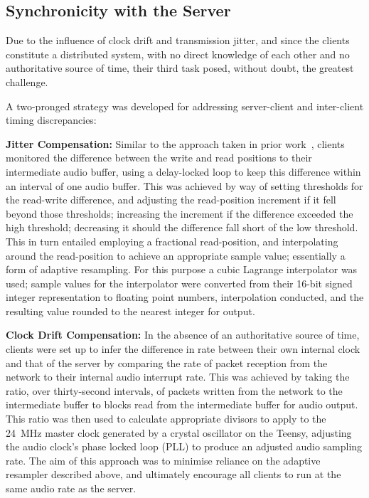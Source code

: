 \subsection{Synchronicity with the Server}\label{subsec:client-sync}

Due to the influence of clock drift and transmission jitter, and since the
clients constitute a distributed system, with no direct knowledge of each other
and no authoritative source of time, their third task posed, without doubt,
the greatest challenge.

A two-pronged strategy was developed for addressing server-client and
inter-client timing discrepancies:

\textbf{Jitter Compensation:}
Similar to the approach taken in prior
work~\citep{rushton_microcontroller-based_2023}, clients monitored the difference
between the write and read positions to their intermediate audio buffer,
using a delay-locked loop to keep this difference within an interval of one
audio buffer.
This was achieved by way of setting thresholds for the read-write difference,
and adjusting the read-position increment if it fell beyond those thresholds;
increasing the increment if the difference exceeded the high threshold;
decreasing it should the difference fall short of the low threshold.
This in turn entailed employing a fractional read-position, and interpolating
around the read-position to achieve an appropriate sample value; essentially
a form of adaptive resampling.
For this purpose a cubic Lagrange interpolator was used; sample values for the
interpolator were converted from their 16-bit signed integer representation
to floating point numbers, interpolation conducted, and the resulting value
rounded to the nearest integer for output.

\textbf{Clock Drift Compensation:}
In the absence of an authoritative source of time, clients were set up to infer
the difference in rate between their own internal clock and that of the server
by comparing the rate of packet reception from the network to their internal
audio interrupt rate.
This was achieved by taking the ratio, over thirty-second intervals, of
packets written from the network to the intermediate buffer to blocks read
from the intermediate buffer for audio output.
This ratio was then used to calculate appropriate divisors to apply to the
\qty{24}{\MHz} master clock generated by a crystal oscillator on the Teensy,
adjusting the audio clock's phase locked loop (PLL) to produce an adjusted audio
sampling rate.
The aim of this approach was to minimise reliance on the adaptive resampler
described above, and ultimately encourage all clients to run at the same audio
rate as the server.

